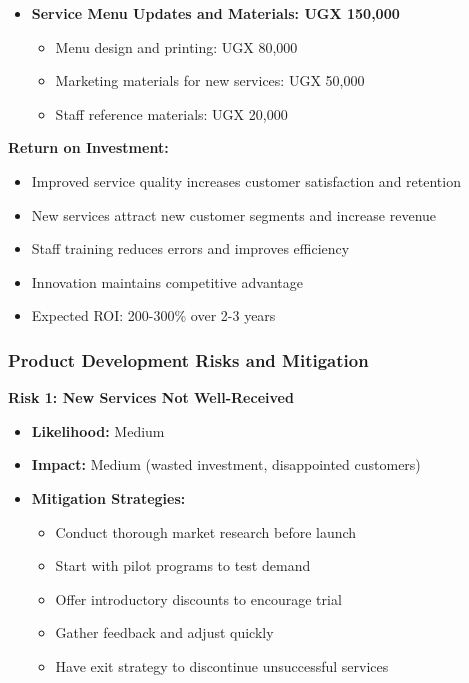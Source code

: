 \begin{itemize}[leftmargin=2em]
    \item \textbf{Service Menu Updates and Materials: UGX 150,000}
    \begin{itemize}
        \item Menu design and printing: UGX 80,000
        \item Marketing materials for new services: UGX 50,000
        \item Staff reference materials: UGX 20,000
    \end{itemize}
\end{itemize}

\textbf{Return on Investment:}
\begin{itemize}[leftmargin=2em]
    \item Improved service quality increases customer satisfaction and retention
    \item New services attract new customer segments and increase revenue
    \item Staff training reduces errors and improves efficiency
    \item Innovation maintains competitive advantage
    \item Expected ROI: 200-300\% over 2-3 years
\end{itemize}

\subsubsection{Product Development Risks and Mitigation}

\textbf{Risk 1: New Services Not Well-Received}
\begin{itemize}[leftmargin=2em]
    \item \textbf{Likelihood:} Medium
    \item \textbf{Impact:} Medium (wasted investment, disappointed customers)
    \item \textbf{Mitigation Strategies:}
    \begin{itemize}
        \item Conduct thorough market research before launch
        \item Start with pilot programs to test demand
        \item Offer introductory discounts to encourage trial
        \item Gather feedback and adjust quickly
        \item Have exit strategy to discontinue unsuccessful services
    \end{itemize}
\end{itemize}

